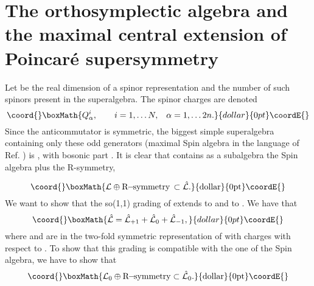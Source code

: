 \documentclass[a4paper,12pt]{article}
\begin{document}
\section{The orthosymplectic algebra and the  maximal central extension
of  Poincar\'e supersymmetry }

Let \coordHE{} be the real dimension of a spinor representation and \coordHE{}
the number of such spinors present in the superalgebra. The spinor
charges are denoted $$\coord{}\boxMath{Q^i_\alpha, \qquad i=1,\dots N,
\;\;\;\alpha=1,\dots 2n.}{dollar}{0pt}\coordE{}$$ Since the anticommutator
\coordHE{} is symmetric, the biggest simple
superalgebra containing only these odd generators (maximal
Spin\coordHE{} algebra in the language of Ref. \cite{dflv}) is
\coordHE{}, with  bosonic part
\coordHE{}. It is clear that \myHighlight{$\La$}\coordHE{} contains as a
subalgebra the Spin\coordHE{} algebra plus the R-symmetry,

$$\coord{}\boxMath{ \La \oplus \rm{R}\!\!-\!\!\rm{symmetry}\,\subset \hat\La.}{dollar}{0pt}\coordE{}$$
 We
want to show that the so(1,1) grading of \myHighlight{$\La$}\coordHE{}  extends to
\myHighlight{$\hat\La$}\coordHE{} and to \coordHE{}.  We have that $$\coord{}\boxMath{
\hat\La=\hat\La_{+1}+\hat\La_0+\hat\La_{-1},}{dollar}{0pt}\coordE{}$$ where
\coordHE{} and \coordHE{}
are in the two-fold symmetric representation of \coordHE{}
with charges \coordHE{} with respect to \coordHE{}. To show that
this grading is compatible with the one of the  Spin\coordHE{}
algebra, we have to show that $$\coord{}\boxMath{ \La_0 \oplus
\rm{R}\!\!-\!\!\rm{symmetry}\subset \hat\La_0.}{dollar}{0pt}\coordE{}$$
\end{document}
